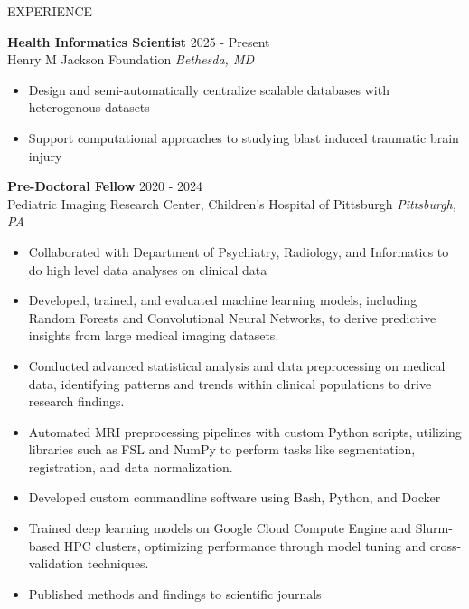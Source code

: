 \documentclass{resume} %
\begin{document}
\begin{rSection}{EXPERIENCE}


\textbf{Health Informatics Scientist} \hfill 2025 - Present\\
Henry M Jackson Foundation \hfill \textit{Bethesda, MD}
 \begin{itemize}
    \itemsep -4pt {} 
     \item Design and semi-automatically centralize scalable databases with heterogenous datasets
     \item Support computational approaches to studying blast induced traumatic brain injury
 \end{itemize}
 
\textbf{Pre-Doctoral Fellow} \hfill 2020 - 2024\\
Pediatric Imaging Research Center, Children's Hospital of Pittsburgh \hfill \textit{Pittsburgh, PA}
 \begin{itemize}
    \itemsep -4pt {} 
    \item Collaborated with Department of Psychiatry, Radiology, and Informatics to do high level data analyses on clinical data
     \item Developed, trained, and evaluated machine learning models, including Random Forests and Convolutional Neural Networks, to derive predictive insights from large medical imaging datasets.
    \item Conducted advanced statistical analysis and data preprocessing on medical data, identifying patterns and trends within clinical populations to drive research findings.
    \item Automated MRI preprocessing pipelines with custom Python scripts, utilizing libraries such as FSL and NumPy to perform tasks like segmentation, registration, and data normalization.
    \item Developed custom commandline software using Bash, Python, and Docker
    \item Trained deep learning models on Google Cloud Compute Engine and Slurm-based HPC clusters, optimizing performance through model tuning and cross-validation techniques.
    \item Published methods and findings to scientific journals
 \end{itemize}
 

\end{rSection}
\end{document}
